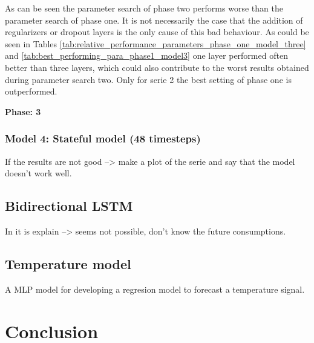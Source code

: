 As can be seen the parameter search of phase two performs worse than the parameter search of phase one. It is not necessarily the case that the addition of regularizers or dropout layers is the only cause of this bad behaviour. As could be seen in Tables \ref{tab:relative_performance_parameters_phase_one_model_three} and \ref{tab:best_performing_para_phase1_model3} one layer performed often better than three layers, which could also contribute to the worst results obtained during parameter search two. Only for serie 2 the best setting of phase one is outperformed. 

\textbf{Phase: 3}\\


\subsubsection{Model 4: Stateful model (48 timesteps)}
If the results are not good --> make a plot of the serie and say that the model doesn't work well. 







\subsection{Bidirectional LSTM}
In \cite{Teuwen2019} it is explain --> seems not possible, don't know the future consumptions.


\subsection{Temperature model}
A MLP model for developing a regresion model to forecast a temperature signal. 




\section{Conclusion}



